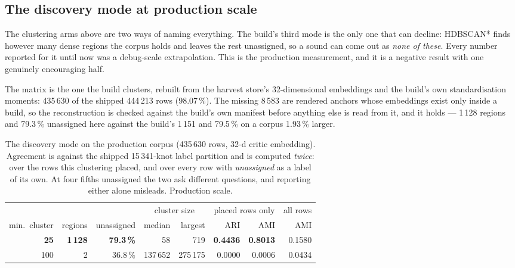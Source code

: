 \documentclass[10pt,twocolumn,a4paper]{article}
\begin{document}
\subsection{The discovery mode at production scale}
\label{sec:density}

The clustering arms above are two ways of naming everything. The build's third mode is the
only one that can decline: HDBSCAN* finds however many dense regions the corpus holds and
leaves the rest unassigned, so a sound can come out as \emph{none of these}. Every number
reported for it until now was a debug-scale extrapolation. This is the production
measurement, and it is a negative result with one genuinely encouraging half.

The matrix is the one the build clusters, rebuilt from the harvest store's 32-dimensional
embeddings and the build's own standardisation moments: 435\,630 of the shipped 444\,213
rows (98.07\,\%). The missing 8\,583 are rendered anchors whose embeddings exist only
inside a build, so the reconstruction is checked against the build's own manifest before
anything else is read from it, and it holds --- 1\,128 regions and 79.3\,\% unassigned here
against the build's 1\,151 and 79.5\,\% on a corpus 1.93\,\% larger.

\begin{table}[t]
\centering
\small
\caption{The discovery mode on the production corpus (435\,630 rows, 32-d critic
embedding). Agreement is against the shipped 15\,341-knot label partition and is computed
\emph{twice}: over the rows this clustering placed, and over every row with
\emph{unassigned} as a label of its own. At four fifths unassigned the two ask different
questions, and reporting either alone misleads. Production scale.}
\label{tab:density}
\begin{tabular}{r r r r r r r r}
\toprule
& & & \multicolumn{2}{c}{cluster size} & \multicolumn{2}{c}{placed rows only} & all rows \\
\cmidrule(lr){4-5}\cmidrule(lr){6-7}\cmidrule(lr){8-8}
min.\ cluster & regions & unassigned & median & largest & ARI & AMI & AMI \\
\midrule
\textbf{25} & \textbf{1\,128} & \textbf{79.3\,\%} & 58 & 719 & \textbf{0.4436} & \textbf{0.8013} & 0.1580 \\
100 & 2 & 36.8\,\% & 137\,652 & 275\,175 & 0.0000 & 0.0006 & 0.0434 \\
\bottomrule
\end{tabular}
\end{table}
\end{document}
